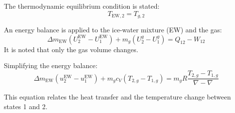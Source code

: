 The thermodynamic equilibrium condition is stated:  
\[
T_{\text{EW},2} = T_{g,2}
\]  

An energy balance is applied to the ice-water mixture (EW) and the gas:  
\[
\Delta m_{\text{EW}} (U_{2}^{\text{EW}} - U_{1}^{\text{EW}}) + m_g (U_{2}^{g} - U_{1}^{g}) = Q_{12} - W_{12}
\]  
It is noted that only the gas volume changes.  

Simplifying the energy balance:  
\[
\Delta m_{\text{EW}} (u_{2}^{\text{EW}} - u_{1}^{\text{EW}}) + m_g c_V (T_{2,g} - T_{1,g}) = m_g R \frac{T_{2,g} - T_{1,g}}{\nabla - \nabla}
\]  

This equation relates the heat transfer and the temperature change between states 1 and 2.